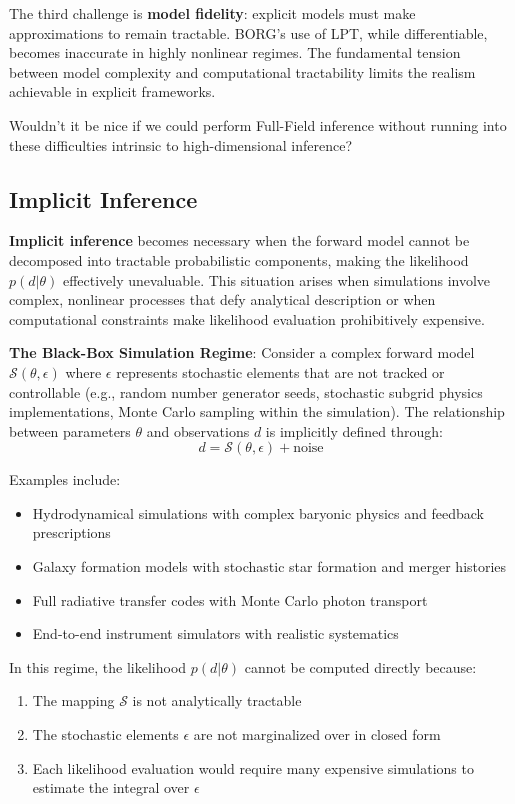 \documentclass[11pt,a4paper]{article}
\theoremstyle{definition}
\begin{document}
The third challenge is \textbf{model fidelity}: explicit models must make approximations to remain tractable. BORG's use of LPT, while differentiable, becomes inaccurate in highly nonlinear regimes. The fundamental tension between model complexity and computational tractability limits the realism achievable in explicit frameworks.

\bigskip

Wouldn't it be nice if we could perform Full-Field inference without running into these difficulties intrinsic to high-dimensional inference?

\subsection{Implicit Inference}

\textbf{Implicit inference} becomes necessary when the forward model cannot be decomposed into tractable probabilistic components, making the likelihood $p(d|\theta)$ effectively unevaluable. This situation arises when simulations involve complex, nonlinear processes that defy analytical description or when computational constraints make likelihood evaluation prohibitively expensive.

\textbf{The Black-Box Simulation Regime}: Consider a complex forward model $\mathcal{S}(\theta, \epsilon)$ where $\epsilon$ represents stochastic elements that are not tracked or controllable (e.g., random number generator seeds, stochastic subgrid physics implementations, Monte Carlo sampling within the simulation). The relationship between parameters $\theta$ and observations $d$ is implicitly defined through:
\begin{equation}
    d = \mathcal{S}(\theta, \epsilon) + \text{noise}
\end{equation}

Examples include:
\begin{itemize}
    \item Hydrodynamical simulations with complex baryonic physics and feedback prescriptions
    \item Galaxy formation models with stochastic star formation and merger histories  
    \item Full radiative transfer codes with Monte Carlo photon transport
    \item End-to-end instrument simulators with realistic systematics
\end{itemize}

In this regime, the likelihood $p(d|\theta)$ cannot be computed directly because:
\begin{enumerate}
    \item The mapping $\mathcal{S}$ is not analytically tractable
    \item The stochastic elements $\epsilon$ are not marginalized over in closed form
    \item Each likelihood evaluation would require many expensive simulations to estimate the integral over $\epsilon$
\end{enumerate}
\end{document}
